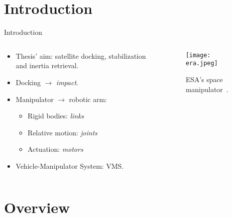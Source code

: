 \makeatletter
\def\beamer@andtitle{\unskip,  }%
\def\beamer@andinst{\\[1pt]}%
\makeatother

\maketitle
\section{Introduction}

\begin{frame}{Introduction}
\begin{columns}
\begin{column}{0.5 \textwidth}
    \begin{itemize}
        \item Thesis' aim: satellite docking, stabilization and inertia retrieval.
        \item Docking $\rightarrow$ \textit{impact}.
        \item Manipulator $\rightarrow$ robotic arm:
        \begin{itemize}
        \item Rigid bodies: \textit{links}
        \item Relative motion: \textit{joints}
        \item Actuation: \textit{motors}
        \end{itemize}
        \item Vehicle-Manipulator System: VMS.
    \end{itemize}
\end{column}
\begin{column}{0.5 \textwidth}
\begin{figure}
\centering
\texttt{[image: era.jpeg]}
\caption{ESA's space manipulator~\cite{esa}.}
\end{figure}
\end{column}
\end{columns}
\end{frame}

\section{Overview}

